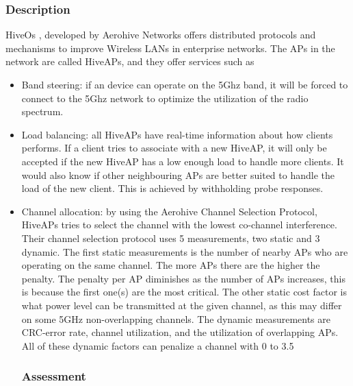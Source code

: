 \subsubsection{Description}
HiveOs \cite{Aerohive}, developed by Aerohive Networks offers distributed protocols and mechanisms to improve Wireless LANs in enterprise networks. The APs 
in the network are called HiveAPs, and they offer services such as
\begin{itemize}
	\item Band steering: if an device can operate on the 5Ghz band, it will be forced to connect to the 5Ghz network to optimize the utilization of the radio spectrum. 
	\item Load balancing: all HiveAPs have real-time information about how clients performs. If a client tries to associate with a new HiveAP, it will only be accepted
				if the new HiveAP has a low enough load to handle more clients. It would also know if other neighbouring APs are better suited to handle the load of the new client.
				This is achieved by withholding probe responses.

	\item Channel allocation: by using the Aerohive Channel Selection Protocol, HiveAPs tries to select the channel with the lowest co-channel interference. Their channel selection protocol uses 5 measurements, two static and 3 dynamic.
	The first static measurements is the number of nearby APs who are operating on the same channel. The more APs there are the higher the penalty. The penalty per AP diminishes as the number of APs increases, this
		is because the first one(s) are the most critical. The other static cost factor is what power level can be transmitted at the given channel, as this may differ on some 5GHz non-overlapping channels. The dynamic measurements are CRC-error rate, channel utilization,
	and the utilization of overlapping APs. All of these dynamic factors can penalize a channel with 0 to 3.5%

\subsubsection{Assessment}
\end{itemize}


